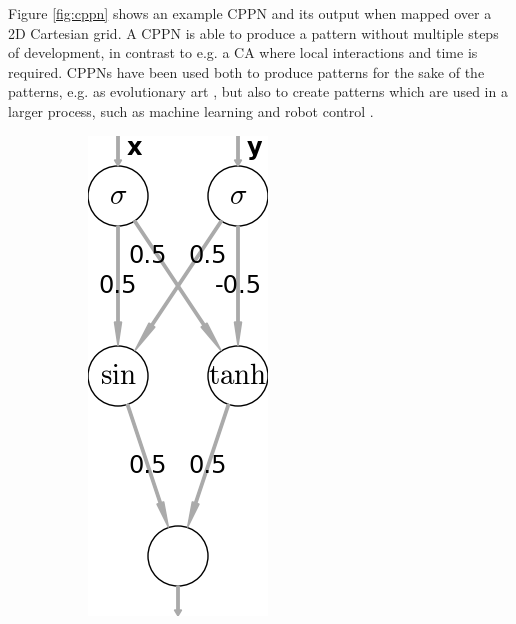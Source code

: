 Figure \ref{fig:cppn} shows an example CPPN and its output when mapped over a 2D Cartesian grid.
A CPPN is able to produce a pattern without multiple steps of development,
in contrast to e.g. a CA where local interactions and time is required.
CPPNs have been used both to produce patterns for the sake of the patterns, e.g. as evolutionary art \cite{stanley2006exploiting},
but also to create patterns which are used in a larger process,
such as machine learning \cite{d2008generative} and robot control \cite{risi2013confronting}.

\begin{figure}
\centering
\begin{subfigure}[b]{.25\columnwidth}
\centering
\includegraphics[width=\columnwidth]{fig/2-cppn}

\end{subfigure}
\end{figure}
